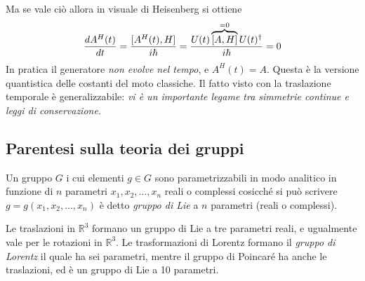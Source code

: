 \documentclass[../../FisicaTeorica.tex]{subfiles}
\begin{document}
Ma se vale ciò allora in visuale di Heisenberg si ottiene
\[
\frac{d A^H(t)}{d t} = \frac{[A^H(t), H]}{i \hbar} = \frac{U(t) \overbrace{[A,H]}^{= 0} U(t)^\dag}{i \hbar} = 0
\]
In pratica il generatore \emph{non evolve nel tempo}, e $A^H(t) = A$. Questa è la versione quantistica delle costanti del moto classiche. Il fatto visto con la traslazione temporale è generalizzabile: \emph{vi è un importante legame tra simmetrie continue e leggi di conservazione}.

\subsection{Parentesi sulla teoria dei gruppi}
\begin{dfn}
Un gruppo $G$ i cui elementi $g \in G$ sono parametrizzabili in modo analitico in funzione di $n$ parametri $x_1, x_2, \dots, x_n$ reali o complessi cosicché si può scrivere $g = g(x_1, x_2, \dots, x_n)$ è detto \emph{gruppo di Lie} a $n$ parametri (reali o complessi).
\end{dfn}

\begin{es}
Le traslazioni in $\mathbb R^3$ formano un gruppo di Lie a tre parametri reali, e ugualmente vale per le rotazioni in $\mathbb R^3$. Le trasformazioni di Lorentz formano il \emph{gruppo di Lorentz} il quale ha sei parametri, mentre il gruppo di Poincaré ha anche le traslazioni, ed è un gruppo di Lie a 10 parametri.
\end{es}
\end{document}
